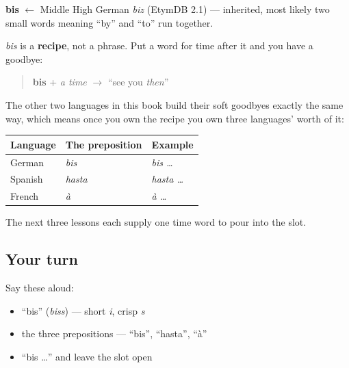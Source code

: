 \begin{cousinweb}
\textbf{bis} $\leftarrow$ Middle High German \emph{biz} (EtymDB 2.1) — inherited, most likely two small words meaning \textquotedblleft{}by\textquotedblright{} and \textquotedblleft{}to\textquotedblright{} run together.
\end{cousinweb}

\begin{grammarlens}[title={Grammar Lens: bis plus a time word}]
\emph{bis} is a \textbf{recipe}, not a phrase. Put a word for time after it and you have a goodbye:

\begin{quote}
\textbf{bis} + \emph{a time} $\to$ \textquotedblleft{}see you \emph{then}\textquotedblright{}
\end{quote}

The other two languages in this book build their soft goodbyes exactly the same way, which means once you own the recipe you own three languages' worth of it:

\noindent
\begin{tabularx}{\linewidth}{@{}>{\raggedright\arraybackslash}X>{\raggedright\arraybackslash}X>{\raggedright\arraybackslash}X@{}}
\toprule
\textbf{Language} & \textbf{The preposition} & \textbf{Example} \\
\midrule
German & \emph{bis} & \emph{bis …} \\
Spanish & \emph{hasta} & \emph{hasta …} \\
French & \emph{à} & \emph{à …} \\
\bottomrule
\end{tabularx}

The next three lessons each supply one time word to pour into the slot.
\end{grammarlens}

\subsection*{Your turn}
Say these aloud:

\begin{itemize}
\raggedright
  \item \textquotedblleft{}bis\textquotedblright{} (\emph{biss}) — short \emph{i}, crisp \emph{s}
  \item the three prepositions — \textquotedblleft{}bis\textquotedblright{}, \textquotedblleft{}hasta\textquotedblright{}, \textquotedblleft{}à\textquotedblright{}
  \item \textquotedblleft{}bis …\textquotedblright{} and leave the slot open
\end{itemize}


